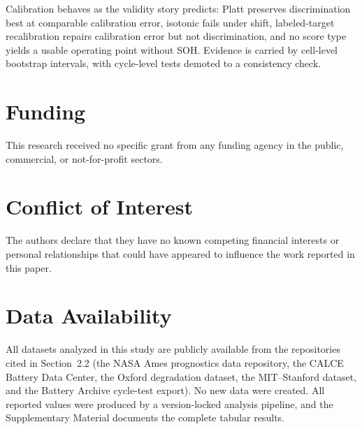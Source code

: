 \documentclass[11pt,a4paper]{article}
\begin{document}
Calibration behaves as the validity story predicts: Platt preserves discrimination best at comparable calibration error, isotonic fails under shift, labeled-target recalibration repairs calibration error but not discrimination, and no score type yields a usable operating point without SOH. Evidence is carried by cell-level bootstrap intervals, with cycle-level tests demoted to a consistency check.


\section*{Funding}
This research received no specific grant from any funding agency in the public, commercial, or not-for-profit sectors.

\section*{Conflict of Interest}
The authors declare that they have no known competing financial interests or personal relationships that could have appeared to influence the work reported in this paper.

\section*{Data Availability}
All datasets analyzed in this study are publicly available from the repositories cited in Section~2.2 (the NASA Ames prognostics data repository, the CALCE Battery Data Center, the Oxford degradation dataset, the MIT--Stanford dataset, and the Battery Archive cycle-test export). No new data were created. All reported values were produced by a version-locked analysis pipeline, and the Supplementary Material documents the complete tabular results.
\end{document}
